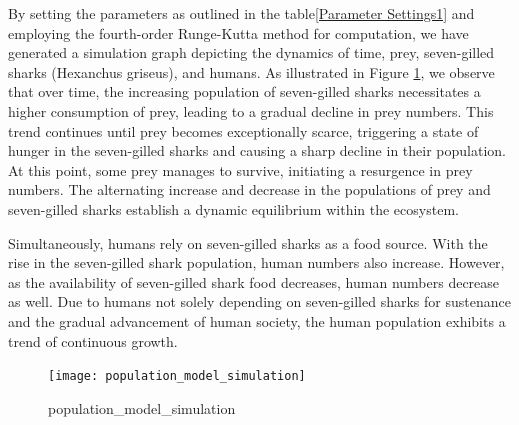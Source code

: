 \documentclass[CTeX = true]{mcmthesis}  %
\begin{document}
By setting the parameters as outlined in the table\ref{Parameter Settings1} and employing the fourth-order Runge-Kutta method for computation, we have generated a simulation graph depicting the dynamics of time, prey, seven-gilled sharks (Hexanchus griseus), and humans. As illustrated in Figure \ref{fig:population_model_simulation}, we observe that over time, the increasing population of seven-gilled sharks necessitates a higher consumption of prey, leading to a gradual decline in prey numbers. This trend continues until prey becomes exceptionally scarce, triggering a state of hunger in the seven-gilled sharks and causing a sharp decline in their population. At this point, some prey manages to survive, initiating a resurgence in prey numbers. The alternating increase and decrease in the populations of prey and seven-gilled sharks establish a dynamic equilibrium within the ecosystem.

Simultaneously, humans rely on seven-gilled sharks as a food source. With the rise in the seven-gilled shark population, human numbers also increase. However, as the availability of seven-gilled shark food decreases, human numbers decrease as well. Due to humans not solely depending on seven-gilled sharks for sustenance and the gradual advancement of human society, the human population exhibits a trend of continuous growth.

\begin{figure}[htbp]
       \centering    
   \texttt{[image: population\_model\_simulation]}
     \caption{population\_model\_simulation}
     \label{fig:population_model_simulation}
\end{figure}
\end{document}
